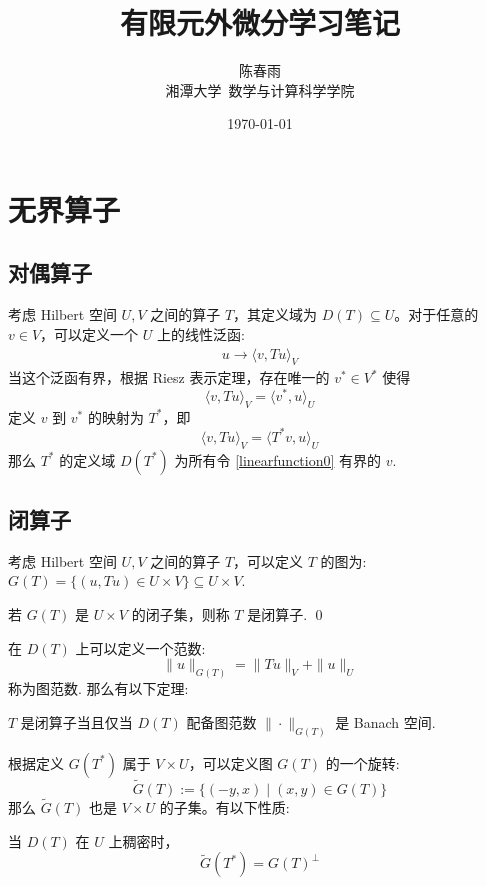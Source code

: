 \documentclass[lang=cn,a4paper,newtx]{elegantpaper}
\title{有限元外微分学习笔记}
\author{陈春雨 \\ 湘潭大学\ 数学与计算科学学院}
\date{\today}
\begin{document}
\maketitle

\section{无界算子}

\subsection{对偶算子}
考虑 Hilbert 空间 $U, V$ 之间的算子 $T$，其定义域为 $D(T) \subseteq U$。对于任意的
$v \in V$，可以定义一个 $U$ 上的线性泛函:
\begin{align}
\label{linearfunction0}
u \to \langle v, Tu \rangle_V
\end{align}
当这个泛函有界，根据 Riesz 表示定理，存在唯一的 $v^* \in V^*$ 使得
$$
\langle v, Tu \rangle_V = \langle v^*, u \rangle_U
$$
定义 $v$ 到 $v^*$ 的映射为 $T^*$，即
$$
\langle v, Tu \rangle_V = \langle T^* v, u \rangle_U
$$
那么 $T^*$ 的定义域 $D(T^*)$ 为所有令 \eqref{linearfunction0} 有界的 $v$.

\subsection{闭算子}
考虑 Hilbert 空间 $U, V$ 之间的算子 $T$，可以定义 $T$ 的图为: $G(T) = \{(u, Tu) \in U \times V\} \subseteq U \times V$.
\begin{definition}
    若 $G(T)$ 是 $U \times V$ 的闭子集，则称 $T$ 是闭算子.
\qed
\end{definition}
在 $D(T)$ 上可以定义一个范数:
$$
\|u\|_{G(T)} = \|Tu\|_V + \|u\|_U
$$
称为图范数. 那么有以下定理:
\begin{theorem}
    $T$ 是闭算子当且仅当 $D(T)$ 配备图范数 $\|\cdot\|_{G(T)}$ 是 Banach 空间. 
\end{theorem}

根据定义 $G(T^*)$ 属于 $V\times U$，可以定义图 $G(T)$ 的一个旋转:
$$
\tilde{G}(T) := \{(-y, x) \mid (x, y) \in G(T)\} 
$$
那么 $\tilde{G}(T)$ 也是 $V \times U$ 的子集。有以下性质:
\begin{property}
    当 $D(T)$ 在 $U$ 上稠密时，
    $$
    \tilde{G}(T^*) = G(T)^{\perp}
    $$
\end{property}
\end{document}
